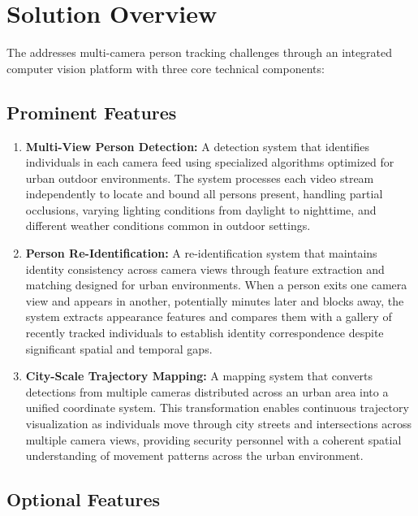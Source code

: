 \section{Solution Overview}
\label{section:solution-overview}

The \usevar{\srsTitle} addresses multi-camera person tracking challenges through an integrated computer vision platform with three core technical components:

\subsection{Prominent Features}
\label{subsection:main-features}

\begin{enumerate}[leftmargin=80pt]
    \item \textbf{Multi-View Person Detection:} A detection system that identifies individuals in each camera feed using specialized algorithms optimized for urban outdoor environments. The system processes each video stream independently to locate and bound all persons present, handling partial occlusions, varying lighting conditions from daylight to nighttime, and different weather conditions common in outdoor settings.
    
    \item \textbf{Person Re-Identification:} A re-identification system that maintains identity consistency across camera views through feature extraction and matching designed for urban environments. When a person exits one camera view and appears in another, potentially minutes later and blocks away, the system extracts appearance features and compares them with a gallery of recently tracked individuals to establish identity correspondence despite significant spatial and temporal gaps.
    
    \item \textbf{City-Scale Trajectory Mapping:} A mapping system that converts detections from multiple cameras distributed across an urban area into a unified coordinate system. This transformation enables continuous trajectory visualization as individuals move through city streets and intersections across multiple camera views, providing security personnel with a coherent spatial understanding of movement patterns across the urban environment.
\end{enumerate}

\subsection{Optional Features}
\label{subsection:optional-features}

